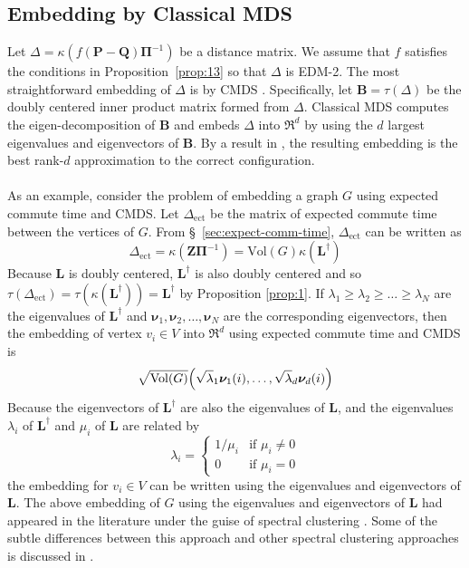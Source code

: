 \documentclass[10pt,twocolumn]{article}
\numberwithin{equation}{section}
\begin{document}
\subsection{Embedding by Classical MDS}
\label{sec:embedd-class-mds}
Let $\Delta = \kappa(f(\mathbf{P} - \mathbf{Q})\bm{\Pi}^{-1})$ be a
distance matrix. We assume that $f$ satisfies the conditions in
Proposition~\ref{prop:13} so that $\Delta$ is EDM-2. The most
straightforward embedding of $\Delta$ is by CMDS
\cite{gower66:_some,torgesen52:_multid}. Specifically, let $\mathbf{B}
= \tau(\Delta)$ be the doubly centered inner product matrix
formed from $\Delta$. Classical MDS computes the eigen-decomposition of
$\mathbf{B}$ and embeds $\Delta$ into $\Re^{d}$ by using
the $d$ largest eigenvalues and eigenvectors of $\mathbf{B}$. By a
result in \cite{eckart36:_approx}, the resulting embedding is the
best rank-$d$ approximation to the correct configuration. \\ \\
\noindent
As an example, consider the problem of embedding a graph $G$ using
expected commute time and CMDS. Let $\Delta_{\mathrm{ect}}$ be the
matrix of expected commute time between the vertices of $G$. From
\S~\ref{sec:expect-comm-time}, $\Delta_{\mathrm{ect}}$ can be written as
\begin{equation*}
  \Delta_{\mathrm{ect}} = \kappa(\mathbf{Z}\bm{\Pi}^{-1}) = \mathrm{Vol}(G)
  \kappa(\mathbf{L}^{\dagger})
\end{equation*}
Because $\mathbf{L}$ is doubly centered, $\mathbf{L}^{\dagger}$ is
also doubly centered and so $\tau(\Delta_{\mathrm{ect}}) =
\tau(\kappa(\mathbf{L}^{\dagger})) = \mathbf{L}^{\dagger}$ by
Proposition \ref{prop:1}. If $\lambda_1 \geq \lambda_2 \geq \dots \geq
\lambda_N$ are the eigenvalues of $\mathbf{L}^{\dagger}$ and
$\bm{\nu}_1, \bm{\nu}_2, \dots, \bm{\nu}_N$ are the corresponding
eigenvectors, then the embedding of vertex $v_i \in V$ into
$\Re^{d}$ using expected commute time and CMDS is
\begin{equation}
  \label{eq:9}
  \sqrt{\mathrm{Vol}(G)} 
\Bigl(\sqrt{\lambda}_1 \bm{\nu}_1(i), \dots, \sqrt{\lambda}_d \bm{\nu}_d(i) \Bigr)
\end{equation}
Because the eigenvectors of $\mathbf{L}^{\dagger}$ are also the
eigenvalues of $\mathbf{L}$, and the eigenvalues $\lambda_i$ of  
$\mathbf{L}^{\dagger}$ and $\mu_i$ of $\mathbf{L}$ are related by
\begin{equation}
  \label{eq:19}
  \lambda_i = \begin{cases}
    1/\mu_i & \text{if $\mu_i \not = 0$} \\
    0 & \text{if $\mu_i = 0$}
    \end{cases}
\end{equation}
the embedding for $v_i \in V$ can be written using the eigenvalues and
eigenvectors of $\mathbf{L}$. The above embedding of $G$ using the
eigenvalues and eigenvectors of
$\mathbf{L}$ had appeared in the literature under the guise of
spectral clustering \cite{yen07:_graph}. Some of the subtle differences between this approach and other 
spectral clustering approaches is discussed in \cite{luxburg07:_tutor_spect_clust}. 
\end{document}

